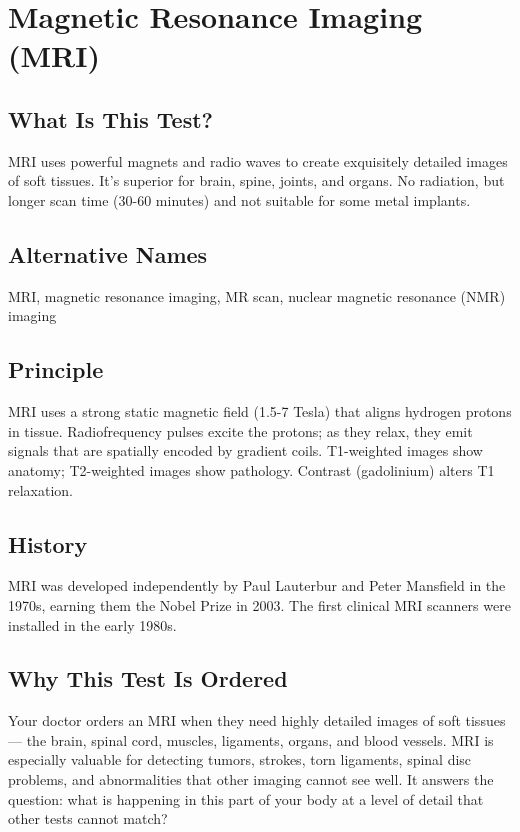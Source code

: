 \chapter{Magnetic Resonance Imaging (MRI)}

\section*{What Is This Test?}
MRI uses powerful magnets and radio waves to create exquisitely detailed images of soft tissues. It's superior for brain, spine, joints, and organs. No radiation, but longer scan time (30-60 minutes) and not suitable for some metal implants.

\section*{Alternative Names}
MRI, magnetic resonance imaging, MR scan, nuclear magnetic resonance (NMR) imaging


\section*{Principle}
MRI uses a strong static magnetic field (1.5-7 Tesla) that aligns hydrogen protons in tissue. Radiofrequency pulses excite the protons; as they relax, they emit signals that are spatially encoded by gradient coils. T1-weighted images show anatomy; T2-weighted images show pathology. Contrast (gadolinium) alters T1 relaxation.

\section*{History}
MRI was developed independently by Paul Lauterbur and Peter Mansfield in the 1970s, earning them the Nobel Prize in 2003. The first clinical MRI scanners were installed in the early 1980s.

\section*{Why This Test Is Ordered}
Your doctor orders an MRI when they need highly detailed images of soft tissues --- the brain, spinal cord, muscles, ligaments, organs, and blood vessels. MRI is especially valuable for detecting tumors, strokes, torn ligaments, spinal disc problems, and abnormalities that other imaging cannot see well. It answers the question: what is happening in this part of your body at a level of detail that other tests cannot match?

